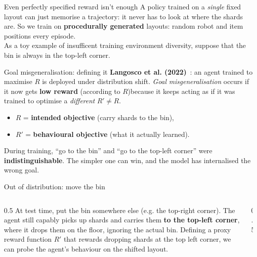 \begin{frame}{}
  \begin{center}
    \end{center}
\end{frame}


\begin{frame}{Even perfectly specified reward isn't enough}
A policy trained on a \emph{single} fixed layout can just memorise a trajectory: it never has to look at where the shards are.
\pause
\vfill
So we train on \textbf{procedurally generated} layouts: random robot and item positions every episode. \\
As a toy example of insufficent training environment diversity, suppose that the bin is always in the top-left corner.
\begin{center}
\end{center}
\end{frame}

\begin{frame}{Goal misgeneralisation: defining it}
\textbf{Langosco et al. (2022)}~: an agent trained to maximise $R$ is deployed 
under distribution shift. \emph{Goal misgeneralisation} occurs if it now gets \textbf{low reward} 
(according to $R$)because it keeps acting as if it was trained to optimise a \emph{different} $R' \neq R$.
\begin{itemize}
  \item $R$ = \textbf{intended objective} (carry shards to the bin),
  \item $R'$ = \textbf{behavioural objective} (what it actually learned).
\end{itemize}
\pause
During training, ``go to the bin'' and ``go to the top-left corner'' were \textbf{indistinguishable}. 
The simpler one can win, and the model has internalised the wrong goal.
\end{frame}

\begin{frame}{Out of distribution: move the bin}
\begin{columns}
\begin{column}{0.5\textwidth}
At test time, put the bin somewhere else (e.g. the top-right corner).
\pause
The agent still capably picks up shards and carries them \textbf{to the top-left corner}, where it drops them on the floor, ignoring the actual bin.
\pause
Defining a proxy reward function $R'$ that rewards dropping shards at the top left corner,
we can probe the agent's behaviour on the shifted layout.
\end{column}
\begin{column}{0.5\textwidth}
\centering
{}
\end{column}
\end{columns}
\end{frame}

